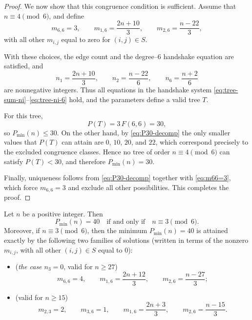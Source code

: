 \documentclass[preprint,12pt]{elsarticle}
\begin{document}
\begin{proof}
\medskip
We now show that this congruence condition is sufficient.
Assume that $n\equiv 4\pmod 6$, and define
\[
m_{6,6}=3,\qquad
m_{1,6}=\frac{2n+10}{3},\qquad
m_{2,6}=\frac{n-22}{3},
\]
with all other $m_{i,j}$ equal to zero for $(i,j)\in S$.

With these choices, the edge count and the degree--$6$ handshake equation are
satisfied, and
\[
n_1=\frac{2n+10}{3},\qquad
n_2=\frac{n-22}{6},\qquad
n_6=\frac{n+2}{6}
\]
are nonnegative integers.
Thus all equations in the handshake system
\eqref{eq:tree-sum-ni}--\eqref{eq:tree-ni-6} hold, and the parameters define a
valid tree $T$.

For this tree,
\[
P(T)=3\,F(6,6)=30,
\]
so $P_{\min}(n)\le 30$.
On the other hand, by \eqref{eq:P30-decomp} the only smaller values that
$P(T)$ can attain are $0$, $10$, $20$, and $22$, which correspond precisely to
the excluded congruence classes.
Hence no tree of order $n\equiv 4\pmod 6$ can satisfy $P(T)<30$, and therefore
$P_{\min}(n)=30$.

Finally, uniqueness follows from \eqref{eq:P30-decomp} together with
\eqref{eq:m66=3}, which force $m_{6,6}=3$ and exclude all other possibilities.
This completes the proof.
\end{proof}

\begin{theorem}
\label{thm:delta6-P40}
Let $n$ be a positive integer. Then
\[
P_{\min}(n)=40
\quad\text{if and only if}\quad
n\equiv 3 \pmod 6.
\]
Moreover, if $n\equiv 3\pmod 6$, then the minimum $P_{\min}(n)=40$ is attained
exactly by the following two families of solutions (written in terms of the
nonzero $m_{i,j}$, with all other $(i,j)\in S$ equal to $0$):
\begin{itemize}
\item[\textup{(i)}] (\emph{the case $n_3=0$}, valid for $n\ge 27$)
\[
m_{6,6}=4,\qquad
m_{1,6}=\frac{2n+12}{3},\qquad
m_{2,6}=\frac{n-27}{3};
\]
\item[\textup{(ii)}] (valid for $n\ge 15$)
\[
m_{2,3}=2,\qquad
m_{3,6}=1,\qquad
m_{1,6}=\frac{2n+3}{3},\qquad
m_{2,6}=\frac{n-15}{3}.
\]
\end{itemize}
\end{theorem}
\end{document}
